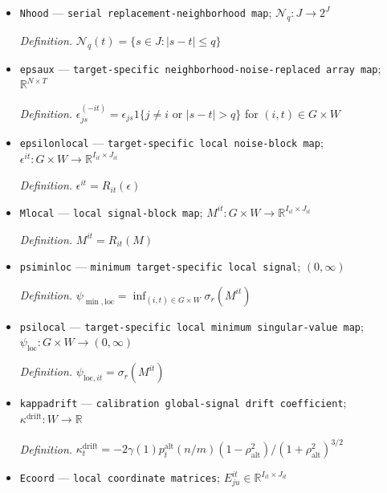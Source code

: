 \documentclass{article}
\begin{document}
\begin{itemize}
  \par\smallskip\noindent\emph{Definition.} \(\Omega_{\mathrm{loc}}^{it}=\Omega\cap(I_{it}\times J_{it})=C(t)\times(S\cup\{t\})\;\cup\;\{i\}\times S\), expressed in the fixed local chart
  \item \texttt{Nhood} --- \texttt{serial replacement-\allowbreak{}neighborhood map}; \(\mathcal N_q:J\to2^J\)
  \par\smallskip\noindent\emph{Definition.} \(\mathcal N_q(t)=\{s\in J:|s-t|\le q\}\)
  \item \texttt{epsaux} --- \texttt{target-\allowbreak{}specific neighborhood-\allowbreak{}noise-\allowbreak{}replaced array map}; \(\mathbb R^{N\times T}\)
  \par\smallskip\noindent\emph{Definition.} \(\epsilon^{(-it)}_{js}=\epsilon_{js}1\{j\ne i\text{ or }|s-t|>q\}\) for \((i,t)\in G\times W\)
  \item \texttt{epsilonlocal} --- \texttt{target-\allowbreak{}specific local noise-\allowbreak{}block map}; \(\epsilon^{it}:G\times W\to\mathbb R^{I_{it}\times J_{it}}\)
  \par\smallskip\noindent\emph{Definition.} \(\epsilon^{it}=R_{it}(\epsilon)\)
  \item \texttt{Mlocal} --- \texttt{local signal-\allowbreak{}block map}; \(M^{it}:G\times W\to\mathbb R^{I_{it}\times J_{it}}\)
  \par\smallskip\noindent\emph{Definition.} \(M^{it}=R_{it}(M)\)
  \item \texttt{psiminloc} --- \texttt{minimum target-\allowbreak{}specific local signal}; \((0,\infty)\)
  \par\smallskip\noindent\emph{Definition.} \(\psi_{\min,\mathrm{loc}}=\inf_{(i,t)\in G\times W}\sigma_r(M^{it})\)
  \item \texttt{psilocal} --- \texttt{target-\allowbreak{}specific local minimum singular-\allowbreak{}value map}; \(\psi_{\mathrm{loc}}:G\times W\to(0,\infty)\)
  \par\smallskip\noindent\emph{Definition.} \(\psi_{\mathrm{loc},it}=\sigma_r(M^{it})\)
  \item \texttt{kappadrift} --- \texttt{calibration global-\allowbreak{}signal drift coefficient}; \(\kappa^{\mathrm{drift}}:W\to\mathbb R\)
  \par\smallskip\noindent\emph{Definition.} \(\kappa^{\mathrm{drift}}_t=-2\gamma(1)p^{\mathrm{alt}}_t(n/m)(1-\rho_{\mathrm{alt}}^2)/(1+\rho_{\mathrm{alt}}^2)^{3/2}\)
  \item \texttt{Ecoord} --- \texttt{local coordinate matrices}; \(E^{it}_{ju}\in\mathbb R^{I_{it}\times J_{it}}\)

\end{itemize}
\end{document}
